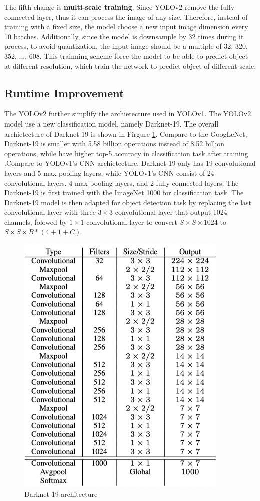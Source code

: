 The fifth change is \textbf{multi-scale training}. Since YOLOv2 remove the fully connected layer, thus it can process the image of any size. Therefore, instead of training with a fixed size, the model choose a new input image dimension every 10 batches. Additionally, since the model is downsample by 32 times during it process, to avoid quantization, the input image should be a multiple of 32: {320, 352, ..., 608}. This trainning scheme force the model to be able to predict object at different resolution, which train the network to predict object of different scale.

\subsection{Runtime Improvement}
The YOLOv2 further simplify the archietecture used in YOLOv1. The YOLOv2 model use a new classification model, namely Darknet-19. The overall archietecture of Darknet-19 is shown in Firgure \ref{fig:darknet19_archite}. Compare to the GoogLeNet, Darknet-19 is smaller with 5.58 billion operations instead of 8.52 billion operations, while have higher top-5 accuracy in classification task after training \cite{yolo9000_2017}.Compare to YOLOv1's CNN archietecture, Darknet-19 only has 19 convolutional layers and 5 max-pooling layers, while YOLOv1's CNN consist of 24 convolutional layers, 4 max-pooling layers, and 2 fully connected layers. The Darknet-19 is first trained with the ImageNet 1000 for classification task. The Darknet-19 model is then adapted for object detection task by replacing the last convolutional layer with three $3 \times 3$ convolutional layer that output 1024 channels, folowed by $1 \times 1$ convolutional layer to convert $S \times S \times 1024$ to $S \times S \times B*(4+1+C)$.

\begin{figure}[!ht]
    \centering
    \includegraphics[width=4in]{figures/darknet19_archite.png}
    \caption{Darknet-19 architecture \cite{yolo9000_2017}} 
    \label{fig:darknet19_archite}
\end{figure}